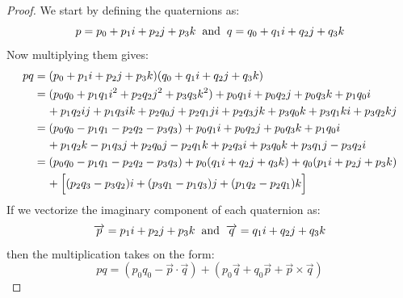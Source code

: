 \documentclass[12pt, letterpaper, onecolumn, conference, final]{IEEEtran}
\theoremstyle{definition}
\theoremstyle{plain}
\begin{document}
\begin{proof}
We start by defining the quaternions as:
\begin{equation*}
p = p_0 + p_1i + p_2j + p_3k \hspace{.2cm} \text{and} \hspace{.2cm} q = q_0 + q_1i + q_2j + q_3k
\end{equation*}
Now multiplying them gives:
\begin{equation*}
\begin{split}
pq &= (p_0 + p_1i + p_2j + p_3k)(q_0 + q_1i + q_2j + q_3k) \\
&= (p_0q_0 + p_1q_1i^2 + p_2q_2j^2 + p_3q_3k^2) + p_0q_1i + p_0q_2j + p_0q_3k + p_1q_0i \\
& \hspace{.4cm} + p_1q_2ij + p_1q_3ik + p_2q_0j + p_2q_1ji + p_2q_3jk + p_3q_0k + p_3q_1ki + p_3q_2kj \\
&= (p_0q_0 - p_1q_1 - p_2q_2 - p_3q_3) + p_0q_1i + p_0q_2j + p_0q_3k + p_1q_0i \\
& \hspace{.4cm} + p_1q_2k - p_1q_3j + p_2q_0j - p_2q_1k + p_2q_3i + p_3q_0k + p_3q_1j - p_3q_2i \\
&= (p_0q_0 - p_1q_1 - p_2q_2 - p_3q_3) + p_0(q_1i + q_2j + q_3k) + q_0(p_1i + p_2j + p_3k) \\
& \hspace{.4cm} + \Big[ (p_2q_3 - p_3q_2)i + (p_3q_1 - p_1q_3)j + (p_1q_2 - p_2q_1)k \Big]
\end{split}
\end{equation*}
If we vectorize the imaginary component of each quaternion as:
\begin{equation*}
\overrightarrow{p} = p_1i + p_2j + p_3k \hspace{.2cm} \text{and} \hspace{.2cm} \overrightarrow{q} = q_1i + q_2j + q_3k
\end{equation*}
then the multiplication takes on the form:
\begin{equation*}
pq = (p_0q_0 - \overrightarrow{p} \cdot \overrightarrow{q}) + (p_0\overrightarrow{q} + q_0\overrightarrow{p} + \overrightarrow{p} \times \overrightarrow{q})
\end{equation*}
\end{proof}
\end{document}
